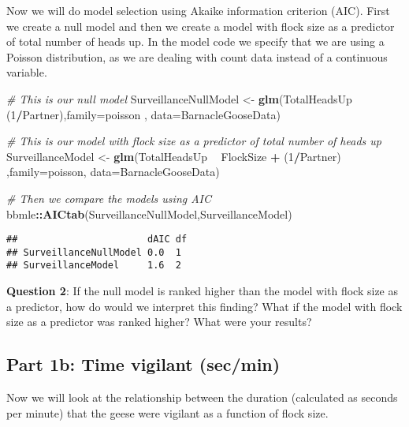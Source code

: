 \documentclass[]{book}
\newenvironment{Shaded}{\begin{snugshade}}{\end{snugshade}}
\newcommand{\CommentTok}[1]{\textcolor[rgb]{0.56,0.35,0.01}{\textit{#1}}}
\newcommand{\DataTypeTok}[1]{\textcolor[rgb]{0.13,0.29,0.53}{#1}}
\newcommand{\DecValTok}[1]{\textcolor[rgb]{0.00,0.00,0.81}{#1}}
\newcommand{\KeywordTok}[1]{\textcolor[rgb]{0.13,0.29,0.53}{\textbf{#1}}}
\newcommand{\NormalTok}[1]{#1}
\newcommand{\OperatorTok}[1]{\textcolor[rgb]{0.81,0.36,0.00}{\textbf{#1}}}
\newcommand{\StringTok}[1]{\textcolor[rgb]{0.31,0.60,0.02}{#1}}
\begin{document}
Now we will do model selection using Akaike information criterion (AIC). First we create a null model and then we create a model with flock size as a predictor of total number of heads up. In the model code we specify that we are using a Poisson distribution, as we are dealing with count data instead of a continuous variable.

\begin{Shaded}
\begin{Highlighting}[]
\CommentTok{# This is our null model}
\NormalTok{SurveillanceNullModel <-}\StringTok{ }\KeywordTok{glm}\NormalTok{(TotalHeadsUp }\OperatorTok{~}\StringTok{ }\NormalTok{(}\DecValTok{1}\OperatorTok{/}\NormalTok{Partner),}\DataTypeTok{family=}\NormalTok{poisson , }\DataTypeTok{data=}\NormalTok{BarnacleGooseData)}

\CommentTok{# This is our model with flock size as a predictor of total number of heads up}
\NormalTok{SurveillanceModel <-}\StringTok{ }\KeywordTok{glm}\NormalTok{(TotalHeadsUp }\OperatorTok{~}\StringTok{ }\NormalTok{FlockSize }\OperatorTok{+}\StringTok{ }\NormalTok{(}\DecValTok{1}\OperatorTok{/}\NormalTok{Partner) ,}\DataTypeTok{family=}\NormalTok{poisson, }\DataTypeTok{data=}\NormalTok{BarnacleGooseData)}

\CommentTok{# Then we compare the models using AIC}
\NormalTok{bbmle}\OperatorTok{::}\KeywordTok{AICtab}\NormalTok{(SurveillanceNullModel,SurveillanceModel)}
\end{Highlighting}
\end{Shaded}

\begin{verbatim}
##                       dAIC df
## SurveillanceNullModel 0.0  1 
## SurveillanceModel     1.6  2
\end{verbatim}

\textbf{Question 2}: If the null model is ranked higher than the model with flock size as a predictor, how do would we interpret this finding? What if the model with flock size as a predictor was ranked higher? What were your results?

\hypertarget{part-1b-time-vigilant-secmin}{%
\subsection*{Part 1b: Time vigilant (sec/min)}\label{part-1b-time-vigilant-secmin}}

Now we will look at the relationship between the duration (calculated as seconds per minute) that the geese were vigilant as a function of flock size.
\end{document}
